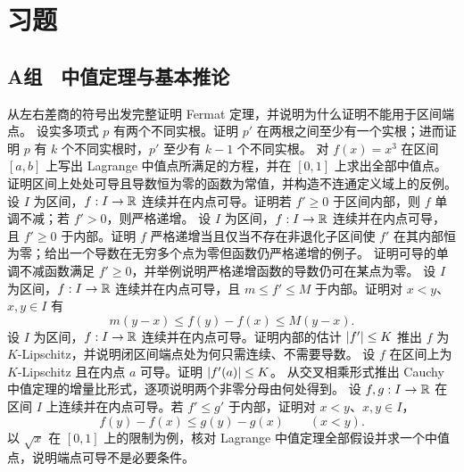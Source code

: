 \section*{习题}

\subsection*{A组　中值定理与基本推论}
\begin{enumerate}[label=\textbf{\thechapter.\arabic*.},ref=\thechapter.\arabic*,leftmargin=3.4em,labelsep=0.7em,itemsep=0.85em,topsep=0.8em]
  从左右差商的符号出发完整证明 Fermat 定理，并说明为什么证明不能用于区间端点。
  设实多项式 \(p\) 有两个不同实根。证明 \(p'\) 在两根之间至少有一个实根；进而证明 \(p\) 有 \(k\) 个不同实根时，\(p'\) 至少有 \(k-1\) 个不同实根。
  对 \(f(x)=x^3\) 在区间 \([a,b]\) 上写出 Lagrange 中值点所满足的方程，并在 \([0,1]\) 上求出全部中值点。
  证明区间上处处可导且导数恒为零的函数为常值，并构造不连通定义域上的反例。
  设 \(I\) 为区间，\(f:I\to\mathbb{R}\) 连续并在内点可导。证明若 \(f'\ge0\) 于区间内部，则 \(f\) 单调不减；若 \(f'>0\)，则严格递增。
  设 \(I\) 为区间，\(f:I\to\mathbb{R}\) 连续并在内点可导，且 \(f'\ge0\) 于内部。证明 \(f\) 严格递增当且仅当不存在非退化子区间使 \(f'\) 在其内部恒为零；给出一个导数在无穷多个点为零但函数仍严格递增的例子。
  证明可导的单调不减函数满足 \(f'\ge0\)，并举例说明严格递增函数的导数仍可在某点为零。
  设 \(I\) 为区间，\(f:I\to\mathbb{R}\) 连续并在内点可导，且 \(m\le f'\le M\) 于内部。证明对 \(x<y\)、\(x,y\in I\) 有
 \[
  m(y-x)\le f(y)-f(x)\le M(y-x).
 \]
  设 \(I\) 为区间，\(f:I\to\mathbb{R}\) 连续并在内点可导。证明内部的估计 \(\left|f'\right|\le K\) 推出 \(f\) 为 \(K\)-Lipschitz，并说明闭区间端点处为何只需连续、不需要导数。
  设 \(f\) 在区间上为 \(K\)-Lipschitz 且在内点 \(a\) 可导。证明 \(\left|f'(a)\right|\le K\)。
  从交叉相乘形式推出 Cauchy 中值定理的增量比形式，逐项说明两个非零分母由何处得到。
  设 \(f,g:I\to\mathbb{R}\) 在区间 \(I\) 上连续并在内点可导。若 \(f'\le g'\) 于内部，证明对 \(x<y\)、\(x,y\in I\)，
 \[
  f(y)-f(x)\le g(y)-g(x)\qquad(x<y).
 \]
  以 \(\sqrt x\) 在 \([0,1]\) 上的限制为例，核对 Lagrange 中值定理全部假设并求一个中值点，说明端点可导不是必要条件。
\end{enumerate}

